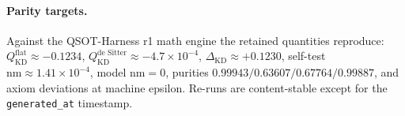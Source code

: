 \paragraph{Parity targets.} Against the QSOT-Harness r1 math engine the retained
quantities reproduce: $Q^{\text{flat}}_{\mathrm{KD}} \approx -0.1234$,
$Q^{\text{de Sitter}}_{\mathrm{KD}} \approx -4.7\times10^{-4}$,
$\Delta_{\mathrm{KD}} \approx +0.1230$, self-test $\mathrm{nm}\approx 1.41\times10^{-4}$,
model $\mathrm{nm}=0$, purities $0.99943/0.63607/0.67764/0.99887$, and axiom deviations at
machine epsilon. Re-runs are content-stable except for the \texttt{generated\_at}
timestamp.
